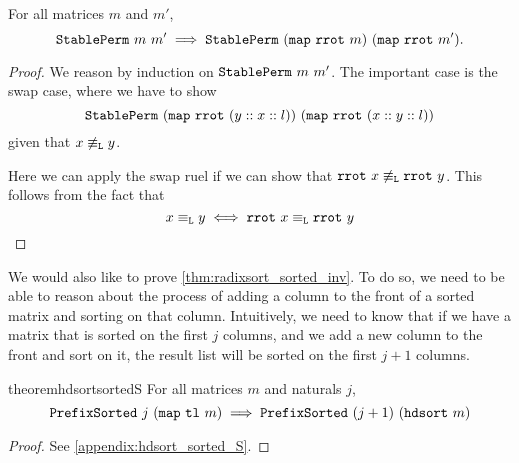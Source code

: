\documentclass[sigplan,10pt,anonymous,review]{thesis}
\begin{document}
\begin{lemma}
  \label{thm:stableperm_map_rrot}
  For all matrices $m$ and $m'$,
  \begin{equation*}
    \texttt{\textup{StablePerm}}~m~m' \implies
    \texttt{\textup{StablePerm}}~(\texttt{\textup{map}}~\texttt{\textup{rrot}}~m)~(\texttt{\textup{map}}~\texttt{\textup{rrot}}~m').
  \end{equation*}
\end{lemma}
\begin{proof}
  We reason by induction on $\texttt{\textup{StablePerm}}~m~m'$. The important
  case is the swap case, where we have to show
  \begin{equation*}
    \texttt{\textup{StablePerm}}~(\texttt{\textup{map}}~\texttt{\textup{rrot}}~(y :: x :: l))~(\texttt{\textup{map}}~\texttt{\textup{rrot}}~(x :: y :: l))
  \end{equation*}
  given that $x \not\equiv_{\texttt{\textup{L}}} y$.

  Here we can apply the swap ruel if we can show that $\texttt{\textup{rrot}}~x
  \not\equiv_{\texttt{\textup{L}}} \texttt{\textup{rrot}}~y$. This follows from the fact that
  \begin{equation*}
    x \equiv_{\texttt{\textup{L}}} y \iff \texttt{\textup{rrot}}~x \equiv_{\texttt{\textup{L}}} \texttt{\textup{rrot}}~y \qedhere
  \end{equation*}
\end{proof}

We would also like to prove \cref{thm:radixsort_sorted_inv}. To do so,
we need to be able to reason about the process of adding a column to
the front of a sorted matrix and sorting on that column. Intuitively,
we need to know that if we have a matrix that is sorted on the first
$j$ columns, and we add a new column to the front and sort on it, the
result list will be sorted on the first $j+1$ columns.
\begin{restatable}{theorem}{hdsortsortedS}
  \label{thm:hdsortsortedS}
  For all matrices $m$ and naturals $j$,
  \begin{equation*}
    \texttt{\textup{PrefixSorted}}~j~(\texttt{\textup{map}}~\texttt{\textup{tl}}~m) \implies
    \texttt{\textup{PrefixSorted}}~(j+1)~(\texttt{\textup{hdsort}}~m)
  \end{equation*}
\end{restatable}
\begin{proof}
  See \cref{appendix:hdsort_sorted_S}.
\end{proof}
\end{document}
